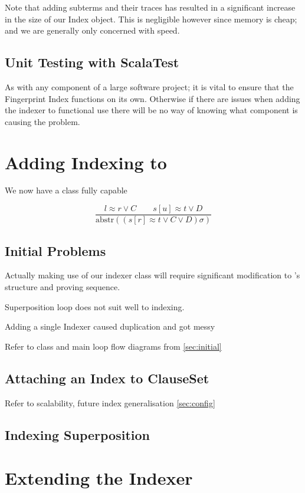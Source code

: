 Note that adding subterms and their traces has resulted in a significant increase in the
size of our Index object. This is negligible however since memory is cheap; and we are
generally only concerned with speed.

\subsection{Unit Testing with ScalaTest}

As with any component of a large software project; it is vital to ensure that the
Fingerprint Index functions on its own. Otherwise if there are issues when adding
the indexer to functional use there will be no way of knowing what component is
causing the problem.


\section{Adding Indexing to \Beagle}
We now have a class fully capable 

\[ \frac{l \approx r \lor C\quad \quad s[u] \approx t \lor D}{\text{abstr}((s[r] \approx t \lor C \lor D)\sigma)} \]


\subsection{Initial Problems}

Actually making use of our indexer class will require significant modification
to \beagle's structure and proving sequence.

Superposition loop does not suit well to indexing. 

Adding a single Indexer caused duplication and got messy

Refer to class and main loop flow diagrams from \ref{sec:initial}

\subsection{Attaching an Index to ClauseSet}

Refer to scalability, future index generalisation \ref{sec:config}

\subsection{Indexing Superposition}


\section{Extending the Indexer}
\label{sec:simp}

